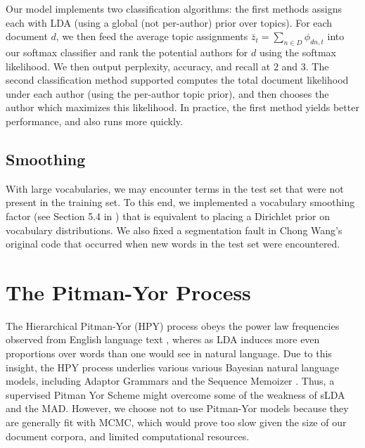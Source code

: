 \documentclass[14pt]{article} %
\theoremstyle{plain}
\theoremstyle{definition}
\theoremstyle{remark}
\begin{document}
\begin{appendix}
Our model implements two classification algorithms: the first methods assigns each with LDA (using a global (not per-author) prior over topics). For each document $d$, we then feed the average topic assignments $\bar{z}_{t}=\sum_{n\in D}\phi_{dn,t}$ into our softmax classifier and rank the potential authors for $d$ using the softmax likelihood. We then output perplexity, accuracy, and recall at $2$ and $3$. The second classification method supported computes the total document likelihood under each author (using the per-author topic prior), and then chooses the author which maximizes this likelihood. In practice, the first method yields better performance, and also runs more quickly.
 
\subsection{Smoothing}
\label{appendix:smoothing}
With large vocabularies, we may encounter terms in the test set that were not present in the training set. To this end, we implemented a vocabulary smoothing factor (see Section 5.4 in \cite{Blei2003}) that is equivalent to placing a Dirichlet prior on vocabulary distributions. We also fixed a segmentation fault in Chong Wang's original code that occurred when new words in the test set were encountered.

\section{The Pitman-Yor Process}
\label{appendix:pitman}
The Hierarchical Pitman-Yor (HPY) process obeys the power law frequencies observed from English language text \cite{teh2006hierarchical}, wheres as LDA induces more even proportions over words than one would see in natural language. Due to this insight, the HPY process underlies various various Bayesian natural language models, including Adaptor Grammars \cite{johnson2007adaptor} and the Sequence Memoizer \cite{wood2009stochastic}. Thus, a supervised Pitman Yor Scheme might overcome some of the weakness of sLDA and the MAD. However, we choose not to use Pitman-Yor models because they are generally fit with MCMC\cite{teh2006hierarchical}, which would prove too slow given the size of our document corpora, and limited computational resources.


\end{appendix}
\end{document}
